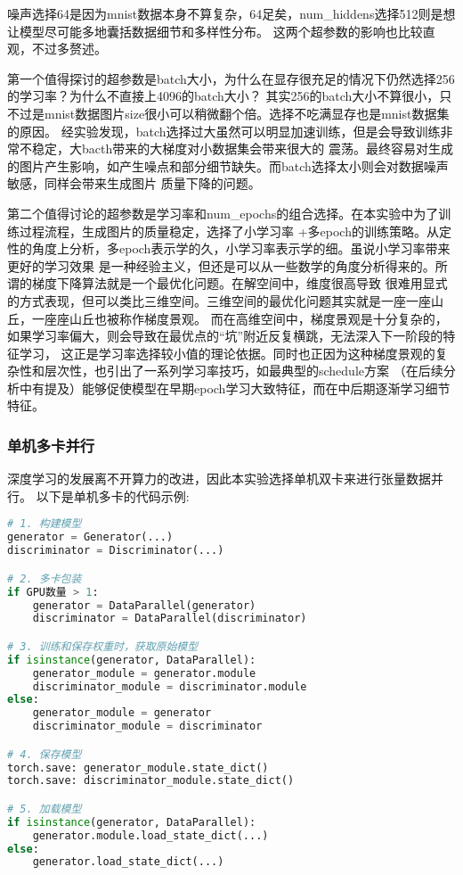 \documentclass[12pt, a4paper]{article}
\begin{document}
\vspace{0.5cm}
噪声选择64是因为mnist数据本身不算复杂，64足矣，num\_hiddens选择512则是想让模型尽可能多地囊括数据细节和多样性分布。
这两个超参数的影响也比较直观，不过多赘述。

第一个值得探讨的超参数是batch大小，为什么在显存很充足的情况下仍然选择256的学习率？为什么不直接上4096的batch大小？
其实256的batch大小不算很小，只不过是mnist数据图片size很小可以稍微翻个倍。选择不吃满显存也是mnist数据集的原因。
经实验发现，batch选择过大虽然可以明显加速训练，但是会导致训练非常不稳定，大bacth带来的大梯度对小数据集会带来很大的
震荡。最终容易对生成的图片产生影响，如产生噪点和部分细节缺失。而batch选择太小则会对数据噪声敏感，同样会带来生成图片
质量下降的问题。

第二个值得讨论的超参数是学习率和num\_epochs的组合选择。在本实验中为了训练过程流程，生成图片的质量稳定，选择了小学习率
+多epoch的训练策略。从定性的角度上分析，多epoch表示学的久，小学习率表示学的细。虽说小学习率带来更好的学习效果
是一种经验主义，但还是可以从一些数学的角度分析得来的。所谓的梯度下降算法就是一个最优化问题。在解空间中，维度很高导致
很难用显式的方式表现，但可以类比三维空间。三维空间的最优化问题其实就是一座一座山丘，一座座山丘也被称作梯度景观。
而在高维空间中，梯度景观是十分复杂的，如果学习率偏大，则会导致在最优点的“坑”附近反复横跳，无法深入下一阶段的特征学习，
这正是学习率选择较小值的理论依据。同时也正因为这种梯度景观的复杂性和层次性，也引出了一系列学习率技巧，如最典型的schedule方案
（在后续分析中有提及）能够促使模型在早期epoch学习大致特征，而在中后期逐渐学习细节特征。


\subsubsection{单机多卡并行}
深度学习的发展离不开算力的改进，因此本实验选择单机双卡来进行张量数据并行。
以下是单机多卡的代码示例:
\begin{lstlisting}[language=Python, caption=GAN 训练主循环示例]
# 1. 构建模型
generator = Generator(...)
discriminator = Discriminator(...)

# 2. 多卡包装
if GPU数量 > 1:
    generator = DataParallel(generator)
    discriminator = DataParallel(discriminator)

# 3. 训练和保存权重时，获取原始模型
if isinstance(generator, DataParallel):
    generator_module = generator.module
    discriminator_module = discriminator.module
else:
    generator_module = generator
    discriminator_module = discriminator

# 4. 保存模型
torch.save: generator_module.state_dict()
torch.save: discriminator_module.state_dict()

# 5. 加载模型
if isinstance(generator, DataParallel):
    generator.module.load_state_dict(...)
else:
    generator.load_state_dict(...)
\end{lstlisting}
\end{document}
